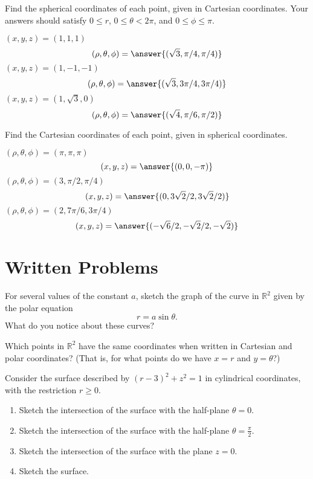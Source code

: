 \documentclass{ximera}
\begin{document}
\begin{problem}
Find the spherical coordinates of each point, given in Cartesian coordinates. Your answers should satisfy $0\leq r$, $0\leq\theta < 2\pi$, and $0\leq \phi\leq \pi$.

$(x,y,z) = (1,1,1)$
\[
(\rho,\theta,\phi) = \answer{(\sqrt{3}, \pi/4, \pi/4)}
\]
$(x,y,z) = (1, -1, -1)$
\[
(\rho,\theta,\phi) = \answer{(\sqrt{3}, 3\pi/4, 3\pi/4)}
\]
$(x,y,z) = (1,\sqrt{3},0)$
\[
(\rho,\theta,\phi) = \answer{(\sqrt{4}, \pi/6, \pi/2)}
\]
\end{problem}

\begin{problem}
Find the Cartesian coordinates of each point, given in spherical coordinates.

$(\rho,\theta,\phi) = (\pi,\pi,\pi)$
\[
(x,y,z) = \answer{(0, 0, -\pi)}
\]
$(\rho,\theta,\phi) = (3,\pi/2,\pi/4)$
\[
(x,y,z) = \answer{(0, 3\sqrt{2}/2, 3\sqrt{2}/2)}
\]
$(\rho,\theta,\phi) = (2,7\pi/6,3\pi/4)$
\[
(x,y,z) = \answer{(-\sqrt{6}/2, -\sqrt{2}/2, -\sqrt{2})}
\]

\end{problem}


\section{Written Problems}
\begin{problem}
For several values of the constant $a$, sketch the graph of the curve in $\mathbb{R}^2$ given by the polar equation
\[
r = a\sin\theta .
\]
What do you notice about these curves?
\end{problem}

\begin{problem}
Which points in $\mathbb{R}^2$ have the same coordinates when written in Cartesian and polar coordinates? (That is, for what points do we have $x=r$ and $y=\theta$?)
\end{problem}

\begin{problem}
Consider the surface described by $(r-3)^2 +z^2 = 1$ in cylindrical coordinates, with the restriction $r\geq 0$.
\begin{enumerate}
\item Sketch the intersection of the surface with the half-plane $\theta = 0$.
\item Sketch the intersection of the surface with the half-plane $\theta = \frac{\pi}{2}$.
\item Sketch the intersection of the surface with the plane $z = 0$. 
\item Sketch the surface.
\end{enumerate}
\end{problem}
\end{document}
